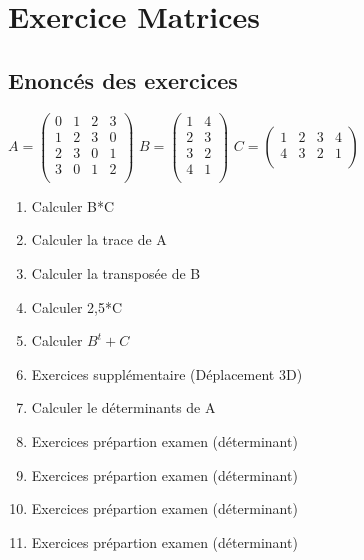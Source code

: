 
\newpage
\section{Exercice Matrices}
\vspace{10mm} %
\subsection{Enoncés des exercices}
\vspace{5mm} %

$
A =
\begin{pmatrix}
  0 & 1 & 2 & 3 \\
  1 & 2 & 3 & 0 \\
  2 & 3 & 0 & 1 \\
  3 & 0 & 1 & 2 \\
\end{pmatrix}
$
\vspace{3mm} %
$
B =
\begin{pmatrix}
  1 & 4 \\
  2 & 3 \\
  3 & 2 \\
  4 & 1 \\
\end{pmatrix}
$
\vspace{3mm} %
$
C =
\begin{pmatrix}
  1 & 2 & 3 & 4 \\
  4 & 3 & 2 & 1 \\
\end{pmatrix}
$

\begin{enumerate}[label=\Alph*)]
\item Calculer B*C
\item Calculer la trace de A
\item Calculer la transposée de B
\item Calculer 2,5*C
\item Calculer $B^{t}+C$
\item Exercices supplémentaire (Déplacement 3D)
\item Calculer le déterminants de A
\item Exercices prépartion examen (déterminant)
\item Exercices prépartion examen (déterminant)
\item Exercices prépartion examen (déterminant)
\item Exercices prépartion examen (déterminant)
\end{enumerate}

